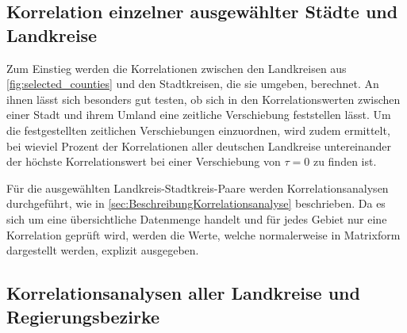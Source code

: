 \subsection{Korrelation einzelner ausgewählter Städte und Landkreise}\label{sec:selected_counties}
Zum Einstieg werden die Korrelationen zwischen den Landkreisen aus \autoref{fig:selected_counties} und den Stadtkreisen, die sie umgeben, berechnet.
An ihnen lässt sich besonders gut testen, ob sich in den Korrelationswerten zwischen einer Stadt und ihrem Umland eine zeitliche Verschiebung feststellen lässt.
Um die festgestellten zeitlichen Verschiebungen einzuordnen, wird zudem ermittelt, bei wieviel Prozent der Korrelationen aller deutschen Landkreise untereinander der höchste Korrelationswert bei einer Verschiebung von $\tau = 0$ zu finden ist.

Für die ausgewählten Landkreis-Stadtkreis-Paare werden Korrelationsanalysen durchgeführt, wie in \autoref{sec:BeschreibungKorrelationsanalyse} beschrieben. Da es sich um eine übersichtliche Datenmenge handelt und für jedes Gebiet nur eine Korrelation geprüft wird, werden die Werte, welche normalerweise in Matrixform dargestellt werden, explizit ausgegeben.
\subsection{Korrelationsanalysen aller Landkreise und Regierungsbezirke}\label{sec:Vorgehensweise:Korrelationsanalysen aller Landkreise und Regierungsbezirke}

